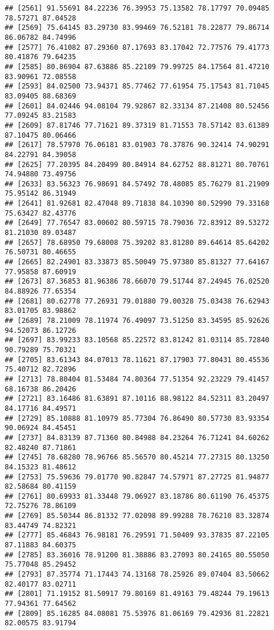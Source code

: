 \documentclass[
]{article}
\begin{document}
\begin{verbatim}
## [2561] 91.55691 84.22236 76.39953 75.13582 78.17797 70.09485 78.57271 87.04528
## [2569] 75.64145 83.29730 83.99469 76.52181 78.22877 79.86714 86.06782 84.74996
## [2577] 76.41082 87.29360 87.17693 83.17042 72.77576 79.41773 80.41876 79.64235
## [2585] 80.86904 87.63886 85.22109 79.99725 84.17564 81.47210 83.90961 72.08558
## [2593] 84.02500 73.94371 85.77462 77.61954 75.17543 81.71045 83.09405 88.68369
## [2601] 84.02446 94.08104 79.92867 82.33134 87.21408 80.52456 77.09245 83.21583
## [2609] 87.81746 77.71621 89.37319 81.71553 78.57142 83.61389 87.10475 80.06466
## [2617] 78.57970 76.06181 83.01903 78.37876 90.32414 74.90291 84.22791 84.39058
## [2625] 77.20395 84.20499 80.84914 84.62752 88.81271 80.70761 74.94880 73.49756
## [2633] 83.56323 76.98691 84.57492 78.48085 85.76279 81.21909 75.95142 86.31949
## [2641] 81.92681 82.47048 89.71838 84.10390 80.52990 79.33168 75.63427 82.43776
## [2649] 77.76547 83.00602 80.59715 78.79036 72.83912 89.53272 81.21030 89.03487
## [2657] 78.68950 79.68008 75.39202 83.81280 89.64614 85.64202 76.50731 80.46655
## [2665] 82.24901 83.33873 85.50049 75.97380 85.81327 77.64167 77.95858 87.60919
## [2673] 87.36853 81.96386 78.66070 79.51744 87.24945 76.02520 84.88926 77.65354
## [2681] 80.62778 77.26931 79.01880 79.00328 75.03438 76.62943 83.01705 83.98862
## [2689] 78.21009 78.11974 76.49097 73.51250 83.34595 85.92626 94.52073 86.12726
## [2697] 83.99233 83.10568 85.22572 83.81242 81.03114 85.72840 90.79289 75.70321
## [2705] 83.61343 84.07013 78.11621 87.17903 77.80431 80.45536 75.40712 82.72896
## [2713] 78.80404 81.53484 74.80364 77.51354 92.23229 79.41457 68.16738 86.20426
## [2721] 83.16486 81.63891 87.10116 88.98122 84.52311 83.20497 84.17716 84.49571
## [2729] 85.10888 81.10979 85.77304 76.86490 80.57730 83.93354 90.06924 84.45451
## [2737] 84.83139 87.71360 80.84988 84.23264 76.71241 84.60262 82.48240 87.71861
## [2745] 78.68280 78.96766 85.56570 80.45214 77.27315 80.13250 84.15323 81.48612
## [2753] 75.59636 79.01770 90.82847 74.57971 87.27725 81.94877 82.58684 80.41159
## [2761] 80.69933 81.33448 79.06927 83.18786 80.61190 76.45375 72.75276 78.86109
## [2769] 85.50344 86.81332 77.02098 89.99288 78.76210 83.32874 83.44749 74.82321
## [2777] 85.46843 76.98181 76.29591 71.50409 93.37835 87.22105 87.11883 84.60375
## [2785] 83.36016 78.91200 81.38886 83.27093 80.24165 80.55050 75.77048 85.29452
## [2793] 87.35774 71.17443 74.13168 78.25926 89.07404 83.50662 82.40177 83.02711
## [2801] 71.19152 81.50917 79.80169 81.49163 79.48244 79.19613 77.94361 77.64562
## [2809] 85.16285 84.08081 75.53976 81.06169 79.42936 81.22821 82.00575 83.91794

\end{verbatim}
\end{document}
